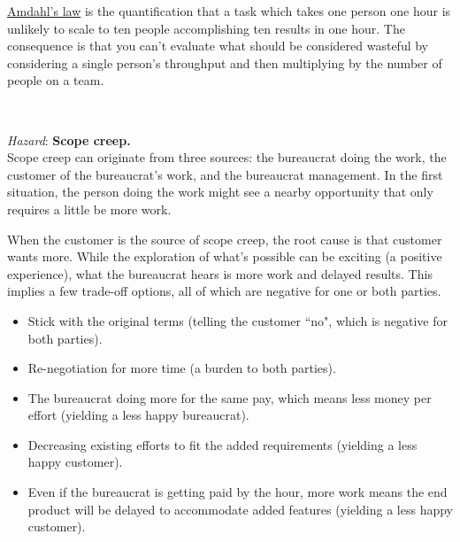 \href{https://en.wikipedia.org/wiki/Amdahl\%27s_law}{Amdahl's law}
is the quantification that a task which takes one person one hour is unlikely to scale to ten people accomplishing ten results in one hour.
The consequence is that you can't evaluate what should be considered wasteful by considering a single person's throughput and then multiplying by the number of people on a team.





\ \\
\begin{samepage}
\textit{Hazard}: \textbf{Scope creep.}\label{sec:scope-creep} \\
Scope creep can originate from three sources: the bureaucrat doing the work, the customer of the bureaucrat's work, and the bureaucrat management. In the first situation, the person doing the work might see a nearby opportunity that only requires a little be more work. 
\end{samepage}

When the customer is the source of scope creep, the root cause is that customer wants more. While the exploration of what's possible can be exciting (a positive experience), what the bureaucrat hears is more work and delayed results. This implies a few trade-off options, all of which are negative for one or both parties.
\begin{itemize}
    \item Stick with the original terms (telling the customer ``no", which is negative for both parties).
    \item Re-negotiation for more time (a burden to both parties).
    \item The bureaucrat doing more for the same pay, which means less money per effort (yielding a less happy bureaucrat).
    \item Decreasing existing efforts to fit the added requirements (yielding a less happy customer).
    \item Even if the bureaucrat is getting paid by the hour, more work means the end product will be delayed to accommodate added features (yielding a less happy customer).
\end{itemize}

